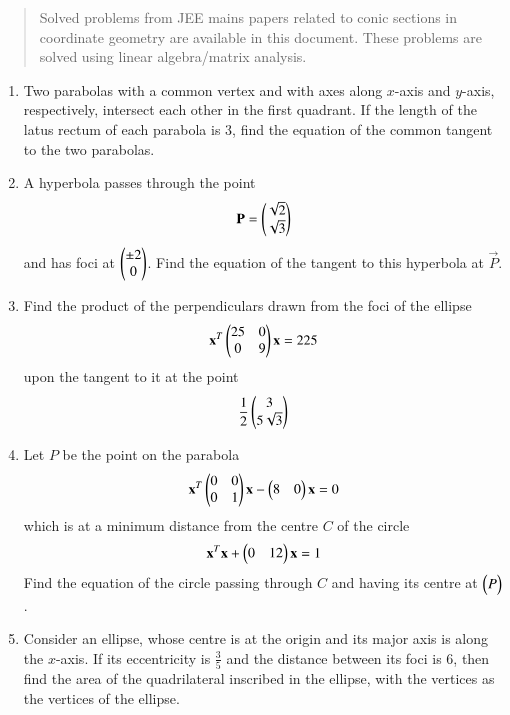 \documentclass[journal,12pt,twocolumn]{IEEEtran}
\begin{document}
\begin{abstract}
	Solved problems from JEE mains papers related to conic sections in coordinate geometry are 
available in this document.  These problems are solved using linear algebra/matrix analysis.
\end{abstract}
\begin{enumerate}[label=\arabic*]
\item Two parabolas with a common vertex and with axes along $x$-axis and $y$-axis, respectively, intersect 
each other in the first quadrant.  If the length of the latus rectum of each parabola is 3, find the equation 
of the common tangent to the two parabolas.
\item A hyperbola passes through the point 
\begin{equation}
\mathbf{P}=\begin{pmatrix}\sqrt{2}\\ \sqrt{3}\end{pmatrix}
\end{equation}
and has foci at $\begin{pmatrix}\pm 2\\ 0\end{pmatrix}$.  Find the equation of the tangent to this hyperbola at 
$\vec{P}$.
\item Find the product of the perpendiculars drawn from the foci of the ellipse
\begin{equation}
\mathbf{x}^T\begin{pmatrix}25 & 0 \\ 0 & 9\end{pmatrix}\mathbf{x}  = 225
\end{equation}
upon the tangent to it at the point
\begin{equation}
\frac{1}{2}\begin{pmatrix}3\\ 5 \sqrt{3}\end{pmatrix}
\end{equation}
\item Let $P$ be the point on the parabola
\begin{equation}
\mathbf{x}^T\begin{pmatrix}0 & 0 \\ 0 & 1\end{pmatrix}\mathbf{x} -\begin{pmatrix}8 & 0 \end{pmatrix}\mathbf{x} 
 = 0
\end{equation}
which is at a minimum distance from the centre $C$ of the circle
\begin{equation}
\mathbf{x}^T\mathbf{x} +\begin{pmatrix}0 & 12 \end{pmatrix}\mathbf{x} 
 = 1 
\end{equation} 
Find the equation of the circle passing through $C$ and having its centre at $\begin{pmatrix}P\end{pmatrix}$. 
\item  Consider an ellipse, whose centre is at the origin and its major axis is along the $x$-axis.  If its 
eccentricity is $\frac{3}{5}$ and the distance between its foci is 6, then find the area of the quadrilateral 
inscribed in the ellipse,  with the vertices as the vertices of the ellipse.

\end{enumerate}
\end{document}
